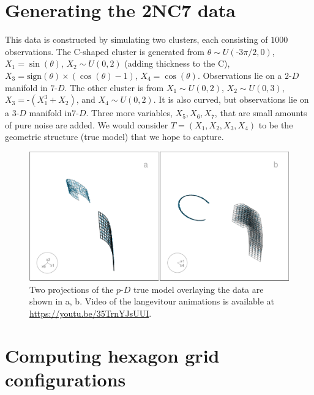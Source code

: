 \documentclass[
  12pt]{article}
\newcommand\pD{$p\text{-}D$}
\newcommand\gD{$2\text{-}D$}
\newcommand\tD{$3\text{-}D$}
\newcommand\sD{$7\text{-}D$}
\begin{document}
\section{Generating the 2NC7 data}\label{generating-the-2nc7-data}

This data is constructed by simulating two clusters, each consisting of
\(1000\) observations. The C-shaped cluster is generated from
\(\theta \sim U(\text{-}3\pi/2, 0)\), \(X_1 = \sin(\theta)\),
\(X_2 \sim U(0, 2)\) (adding thickness to the C),
\(X_3 = \text{sign}(\theta) \times (\cos(\theta) - 1)\),
\(X_4 = \cos(\theta)\). Observations lie on a \gD{} manifold in \sD{}.
The other cluster is from \(X_1 \sim U(0, 2)\), \(X_2 \sim U(0, 3)\),
\(X_3 = \text{-}(X_1^3 + X_2)\), and \(X_4 \sim U(0, 2)\). It is also
curved, but observations lie on a \tD{} manifold in\sD{}. Three more
variables, \(X_5, X_6, X_7\), that are small amounts of pure noise are
added. We would consider \(T=(X_1, X_2, X_3, X_4)\) to be the geometric
structure (true model) that we hope to capture.

\begin{figure}[H]

{\centering \includegraphics[width=1\linewidth,height=\textheight,keepaspectratio]{appendix_files/figure-pdf/unnamed-chunk-4-1.pdf}

}

\caption{Two projections of the \pD{} true model overlaying the data are
shown in a, b. Video of the langevitour animations is available at
\url{https://youtu.be/35TrnYJsUUI}.}

\end{figure}%

\section{Computing hexagon grid
configurations}\label{computing-hexagon-grid-configurations}
\end{document}
